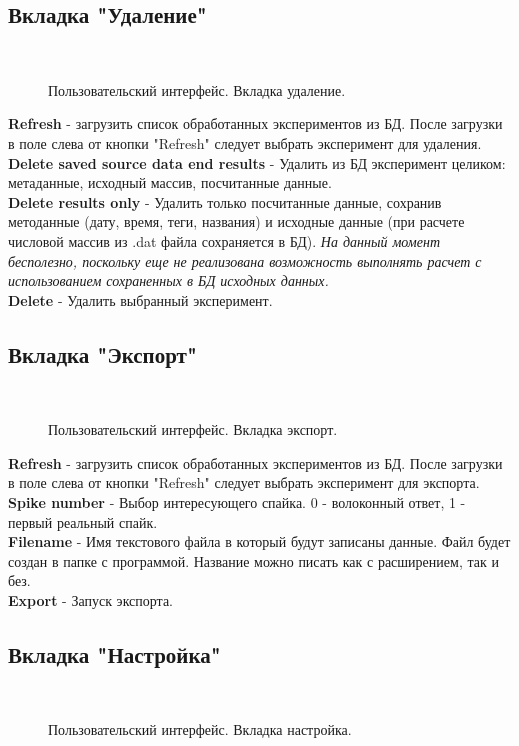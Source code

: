 \documentclass[12pt,a4paper]{report}
\begin{document}
\subsection{Вкладка "Удаление"} 
\begin{figure}[h!]
\vspace{-5pt}
	\\
 \caption{Пользовательский интерфейс. Вкладка удаление.}
\label{fig:delete}
\end{figure}

\textbf{Refresh} - загрузить список обработанных экспериментов из БД. После загрузки в поле слева от кнопки "Refresh" следует выбрать эксперимент для удаления.
\textbf{Delete saved source data end results} - Удалить из БД эксперимент целиком: метаданные, исходный массив, посчитанные данные.\\
\textbf{Delete results only} - Удалить только посчитанные данные, сохранив методанные (дату, время, теги, названия) и исходные данные (при расчете числовой массив из .dat файла сохраняется в БД). \textit{На данный момент бесполезно, поскольку еще не реализована возможность выполнять расчет с использованием сохраненных в БД исходных данных.}\\
\textbf{Delete} - Удалить выбранный эксперимент.\\
\newpage
\subsection{Вкладка "Экспорт"}
\begin{figure}[h!]
\vspace{-5pt}
	\\
 \caption{Пользовательский интерфейс. Вкладка экспорт.}
\label{fig:export}
\end{figure}
\textbf{Refresh} - загрузить список обработанных экспериментов из БД. После загрузки в поле слева от кнопки "Refresh" следует выбрать эксперимент для экспорта.
\textbf{Spike number} - Выбор интересующего спайка. 0 - волоконный ответ, 1 - первый реальный спайк.\\
\textbf{Filename} - Имя текстового файла в который будут записаны данные. Файл будет создан в папке с программой. Название можно писать как с расширением, так и без.\\
\textbf{Export} - Запуск экспорта.\\
\newpage
\subsection{Вкладка "Настройка"}
\begin{figure}[h!]
\vspace{-5pt}
	\\
 \caption{Пользовательский интерфейс. Вкладка настройка.}
\label{fig:config}
\end{figure}
\end{document}

